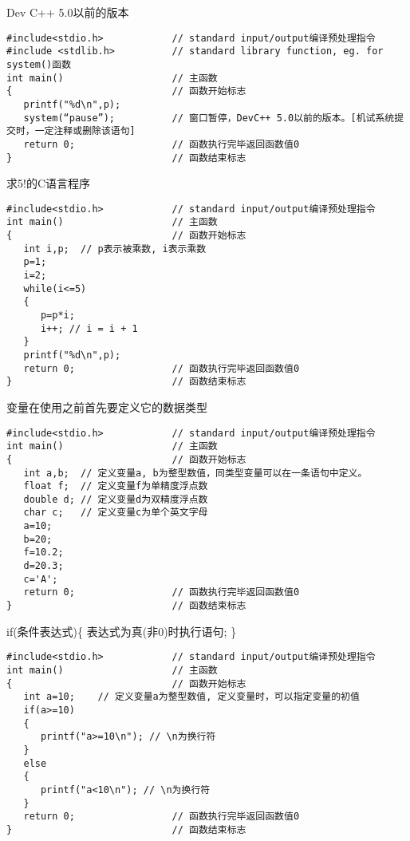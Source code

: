 
\begin{frame}[fragile]{Dev C++ 5.0以前的版本}
\begin{lstlisting}
#include<stdio.h>            // standard input/output编译预处理指令
#include <stdlib.h>          // standard library function, eg. for system()函数 
int main()                   // 主函数
{                            // 函数开始标志
   printf("%d\n",p);
   system(“pause”);          // 窗口暂停，DevC++ 5.0以前的版本。[机试系统提交时，一定注释或删除该语句] 
   return 0;                 // 函数执行完毕返回函数值0
}                            // 函数结束标志
\end{lstlisting}
\end{frame}

\begin{frame}[fragile]{求5!的C语言程序}
\begin{lstlisting}
#include<stdio.h>            // standard input/output编译预处理指令
int main()                   // 主函数
{                            // 函数开始标志
   int i,p;  // p表示被乘数, i表示乘数
   p=1;
   i=2;
   while(i<=5)
   {  
      p=p*i;
      i++; // i = i + 1
   }
   printf("%d\n",p);
   return 0;                 // 函数执行完毕返回函数值0
}                            // 函数结束标志
\end{lstlisting}
\end{frame}

\begin{frame}[fragile]{变量在使用之前首先要定义它的数据类型}
\begin{lstlisting}
#include<stdio.h>            // standard input/output编译预处理指令
int main()                   // 主函数
{                            // 函数开始标志
   int a,b;  // 定义变量a, b为整型数值，同类型变量可以在一条语句中定义。
   float f;  // 定义变量f为单精度浮点数
   double d; // 定义变量d为双精度浮点数
   char c;   // 定义变量c为单个英文字母
   a=10;
   b=20;
   f=10.2;
   d=20.3;
   c='A';
   return 0;                 // 函数执行完毕返回函数值0
}                            // 函数结束标志
\end{lstlisting}
\end{frame}

\begin{frame}[fragile]{if(条件表达式)\{ 表达式为真(非0)时执行语句; \}}
\begin{lstlisting}
#include<stdio.h>            // standard input/output编译预处理指令
int main()                   // 主函数
{                            // 函数开始标志
   int a=10;    // 定义变量a为整型数值, 定义变量时，可以指定变量的初值
   if(a>=10)
   {
      printf("a>=10\n"); // \n为换行符
   }
   else
   {
      printf("a<10\n"); // \n为换行符
   }
   return 0;                 // 函数执行完毕返回函数值0
}                            // 函数结束标志
\end{lstlisting}
\end{frame}

